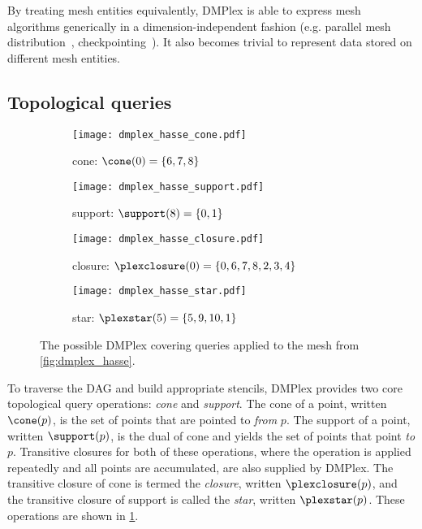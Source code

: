 \documentclass[thesis]{subfiles}
\begin{document}
By treating mesh entities equivalently, DMPlex is able to express mesh algorithms generically in a dimension-independent fashion (e.g. parallel mesh distribution~\cite{knepleyUnstructuredOverlappingMesh2015}, checkpointing~\cite{hamEfficientNtoMCheckpointing2024}).
It also becomes trivial to represent data stored on different mesh entities.

\subsection{Topological queries}
\label{sec:dmplex_queries}

\begin{figure}
  \centering
  \begin{subfigure}{.49\textwidth}
    \centering
    \texttt{[image: dmplex\_hasse\_cone.pdf]}
    \caption{cone: $\cone(0) = \{6,7,8\}$}
  \end{subfigure}
  \begin{subfigure}{.49\textwidth}
    \centering
    \texttt{[image: dmplex\_hasse\_support.pdf]}
    \caption{support: $\support(8) = \{0,1\}$}
  \end{subfigure}

  \vspace{1em}

  \begin{subfigure}{.49\textwidth}
    \centering
    \texttt{[image: dmplex\_hasse\_closure.pdf]}
    \caption{closure: $\plexclosure(0) = \{0,6,7,8,2,3,4\}$}
  \end{subfigure}
  \begin{subfigure}{.49\textwidth}
    \centering
    \texttt{[image: dmplex\_hasse\_star.pdf]}
    \caption{star: $\plexstar(5) = \{5,9,10,1\}$}
  \end{subfigure}

  \caption{
    The possible DMPlex covering queries applied to the mesh from \cref{fig:dmplex_hasse}.
  }
  \label{fig:dmplex_queries}
\end{figure}

To traverse the DAG and build appropriate stencils, DMPlex provides two core topological query operations: \emph{cone} and \emph{support}.
The cone of a point, written $\cone(p)$, is the set of points that are pointed to \emph{from} $p$.
The support of a point, written $\support(p)$, is the dual of cone and yields the set of points that point \emph{to} $p$.
Transitive closures for both of these operations, where the operation is applied repeatedly and all points are accumulated, are also supplied by DMPlex.
The transitive closure of cone is termed the \emph{closure}, written $\plexclosure(p)$, and the transitive closure of support is called the \emph{star}, written $\plexstar(p)$.
These operations are shown in \cref{fig:dmplex_queries}.
\end{document}
